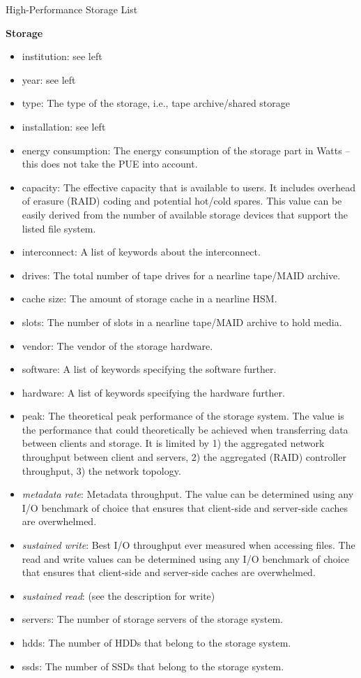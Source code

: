 \documentclass[portrait,a0paper,fontscale=0.4]{baposter}
\newcommand{\compresslist}{%
\setlength{\itemsep}{1pt}%
\setlength{\parskip}{0pt}%
\setlength{\parsep}{0pt}%
}
\begin{document}
\begin{poster}
\begin{posterbox}[name=schedule,column=1,span=2, below=concept]{High-Performance Storage List}
\begin{minipage}{0.48\textwidth}
\textbf{Storage}

{
\scriptsize
\begin{itemize}\compresslist
\item institution:  see left
\item year:  see left
\item type: The type of the storage, i.e., tape archive/shared storage
\item installation: see left
\item energy consumption: The energy consumption of the storage part in Watts – this does not take the PUE into account.
\item capacity: The effective capacity that is available to users. It includes overhead of erasure (RAID) coding and potential hot/cold spares. This value can be easily derived from the number of available storage devices that support the listed file system.
\item interconnect: A list of keywords about the interconnect.
\item drives: The total number of tape drives for a nearline tape/MAID archive.
\item cache size: The amount of storage cache in a nearline HSM.
\item slots: The number of slots in a nearline tape/MAID archive to hold media.
\item vendor: The vendor of the storage hardware.
\item software: A list of keywords specifying the software further.
\item hardware: A list of keywords specifying the hardware further.
\item peak: The theoretical peak performance of the storage system. The value is the performance that could theoretically be achieved when transferring data between clients and storage. It is limited by 1) the aggregated network throughput between client and servers, 2) the aggregated (RAID) controller throughput, 3) the network topology.
\item \textit{metadata rate}: Metadata throughput. The value can be determined using any I/O benchmark of choice that ensures that client-side and server-side caches are overwhelmed.
\item \textit{sustained write}: Best I/O throughput ever measured when accessing files. The read and write values can be determined using any I/O benchmark of choice that ensures that client-side and server-side caches are overwhelmed.
\item \textit{sustained read}: (see the description for write)
\item servers: The number of storage servers of the storage system.
\item hdds: The number of HDDs that belong to the storage system.
\item ssds: The number of SSDs that belong to the storage system.
\end{itemize}
}
\end{minipage}


\end{posterbox}
\end{poster}
\end{document}
